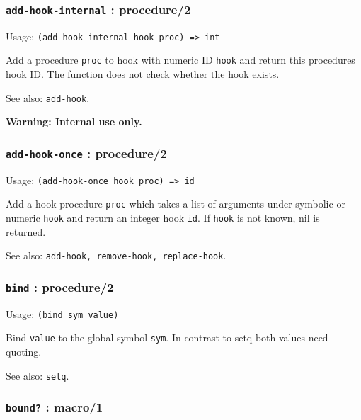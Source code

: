 \documentclass[
]{article}
\newcommand{\passthrough}[1]{#1}
\begin{document}
\hypertarget{add-hook-internal-procedure2}{%
\subsubsection{\texorpdfstring{\texttt{add-hook-internal} :
procedure/2}{add-hook-internal : procedure/2}}\label{add-hook-internal-procedure2}}

Usage: \passthrough{\lstinline!(add-hook-internal hook proc) => int!}

Add a procedure \passthrough{\lstinline!proc!} to hook with numeric ID
\passthrough{\lstinline!hook!} and return this procedures hook ID. The
function does not check whether the hook exists.

See also: \passthrough{\lstinline!add-hook!}.

\textbf{Warning: Internal use only.}

\hypertarget{add-hook-once-procedure2}{%
\subsubsection{\texorpdfstring{\texttt{add-hook-once} :
procedure/2}{add-hook-once : procedure/2}}\label{add-hook-once-procedure2}}

Usage: \passthrough{\lstinline!(add-hook-once hook proc) => id!}

Add a hook procedure \passthrough{\lstinline!proc!} which takes a list
of arguments under symbolic or numeric \passthrough{\lstinline!hook!}
and return an integer hook \passthrough{\lstinline!id!}. If
\passthrough{\lstinline!hook!} is not known, nil is returned.

See also: \passthrough{\lstinline!add-hook, remove-hook, replace-hook!}.

\hypertarget{bind-procedure2}{%
\subsubsection{\texorpdfstring{\texttt{bind} :
procedure/2}{bind : procedure/2}}\label{bind-procedure2}}

Usage: \passthrough{\lstinline!(bind sym value)!}

Bind \passthrough{\lstinline!value!} to the global symbol
\passthrough{\lstinline!sym!}. In contrast to setq both values need
quoting.

See also: \passthrough{\lstinline!setq!}.

\hypertarget{bound-macro1}{%
\subsubsection{\texorpdfstring{\texttt{bound?} :
macro/1}{bound? : macro/1}}\label{bound-macro1}}
\end{document}
